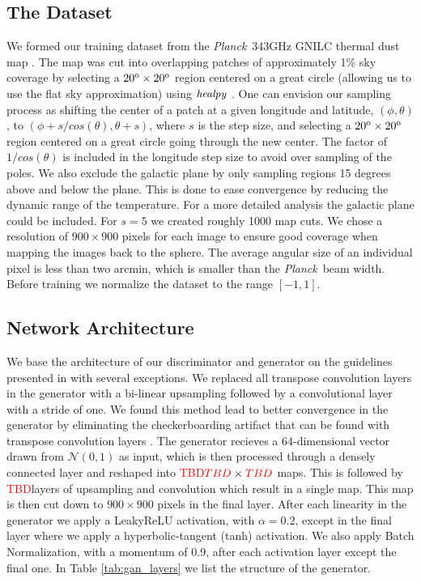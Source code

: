 \documentclass[twocolumn]{aastex62}
\def\tbd{\textcolor{red}{TBD}}
\newcommand{\planck}{\textit{Planck}}
\begin{document}
\subsection{The Dataset}
We formed our training dataset from the \planck\ 343GHz GNILC thermal dust map \citep{planck16-48}. The map was cut into overlapping patches of approximately 1\% sky coverage by selecting a $20^{\rm{o}} \times 20^{\rm{o}}$ region centered on a great circle (allowing us to use the flat sky approximation) using $\it{healpy}$ \citep{gorski05}.  One can envision our sampling process as shifting the center of a patch at a given longitude and latitude, $(\phi,\theta)$, to  $(\phi+s/cos(\theta),\theta+s)$, where $s$ is the step size,  and selecting a $20^{\rm{o}} \times 20^{\rm{o}}$ region centered on a great circle going through the new center. The factor of $1/cos(\theta)$ is included in the longitude step size to avoid over sampling of the poles. We also exclude the galactic plane by only sampling regions 15 degrees above and below the plane. This is done to ease convergence by reducing the dynamic range of the temperature. For a more detailed analysis the galactic plane could be included. For $s=5$ we created roughly 1000 map cuts.  We chose a resolution of $900\times900$ pixels for each image to ensure good coverage when mapping the images back to the sphere. The average angular size of an individual pixel is less than two arcmin, which is smaller than the \planck\ beam width. Before training we normalize the dataset to the range $[-1,1]$.

\subsection{Network Architecture}
We base the architecture of our discriminator and generator on the guidelines presented in \cite{radford15} with several exceptions.
We replaced all transpose convolution layers in the generator with a bi-linear upsampling followed by a convolutional layer with a stride of one.
We found this method lead to better convergence in the generator by eliminating the checkerboarding artifact that can be found with transpose convolution layers \citep{odena16}.
The generator recieves a 64-dimensional vector drawn from $\mathcal{N}(0,1)$ as input, which is then processed through a densely connected layer and reshaped into \tbd $\tbd \times \tbd$ maps.
This is followed by \tbd layers of upsampling and convolution which result in a single map.
This map is then cut down to $900\times900$ pixels in the final layer. 
After each linearity in the generator we apply a LeakyReLU activation, with $\alpha = 0.2$, except in the final layer where we apply a hyperbolic-tangent (tanh) activation.
We also apply Batch Normalization, with a momentum of 0.9, after each activation layer except the final one. In Table \ref{tab:gan_layers} we list the structure of the generator.
\end{document}

